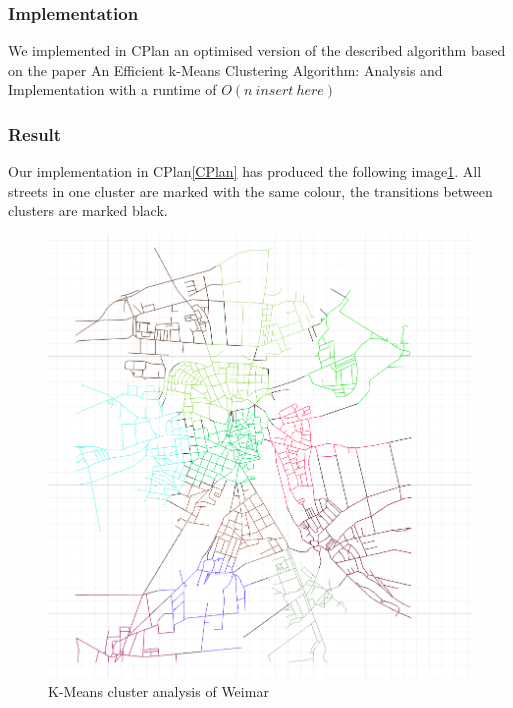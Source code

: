\documentclass[11pt, a4paper]{report}
\begin{document}
\subsubsection{Implementation}
We implemented in CPlan\citep{cPlan:2015} an optimised version of the described algorithm based on the paper An Efficient k-Means Clustering Algorithm: Analysis and Implementation \cite{kmeans:2002} with a runtime of $O(n\ insert\ here)$

\pagebreak
\subsubsection{Result}
Our implementation in CPlan\ref{CPlan} has produced the following image\ref{fig:KmeansGenerated}. All streets in one cluster are marked with the same colour, the transitions between clusters are marked black.
\begin{figure}[!h]
    \centering
    \includegraphics[width=\textwidth]{clusteranalysis_kmeans_result.png}
    \caption{K-Means cluster analysis of Weimar\label{fig:KmeansGenerated}}
\end{figure}
\pagebreak
\end{document}
